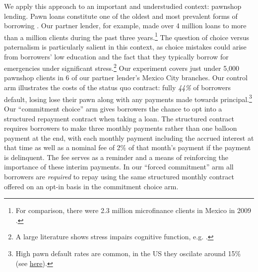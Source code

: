 \documentclass[11pt, a4paper]{article}
\begin{document}
We apply this approach to an important and understudied context: pawnshop lending. 
Pawn loans constitute one of the oldest and most prevalent forms of borrowing \citep{carter2012pawnshops}.
Our partner lender, for example, made over 4 million loans to more than a million clients during the past three years.\footnote{For comparison, there were 2.3 million microfinance clients in Mexico in 2009 \citep{Pedroza:2010}.} 
The question of choice versus paternalism is particularly salient in this context, as choice mistakes could arise from borrowers' low education and the fact that they typically borrow for emergencies under significant stress.\footnote{A large literature shows  stress impairs cognitive function, e.g. \cite{StressReview}.}
Our experiment covers just under 5,000 pawnshop clients in 6 of our partner lender's Mexico City branches. Our control arm illustrates the costs of the status quo contract: fully \emph{44\%} of borrowers default, losing lose their pawn along with any payments made towards principal.\footnote{High pawn default rates are common, in the US they oscilate around 15\% (see \href{https://tinyurl.com/yc2x5bjf}{here}).} Our ``commitment choice'' arm gives borrowers the chance to opt into a structured repayment contract when taking a loan. The structured contract requires borrowers to make three monthly payments rather than one balloon payment at the end, with each monthly payment including the accrued interest at that time as well as a nominal fee of 2\% of that month's payment if the payment is delinquent. The fee serves as a reminder and a means of reinforcing the importance of these interim payments. In our ``forced commitment'' arm all borrowers are \emph{required} to repay using the same structured monthly contract offered on an opt-in basis in the commitment choice arm. 
\end{document}
